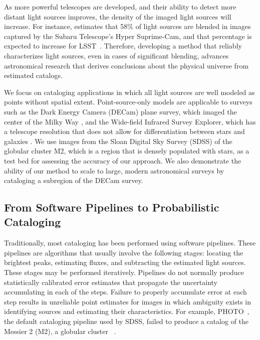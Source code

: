 As more powerful telescopes are developed, and their ability to detect more distant light sources improves,
the density of the imaged light sources will increase.
For instance, \cite{bosch2018hyper} estimates that 58\% of light sources are blended in images captured by the
Subaru Telescope’s Hyper Suprime-Cam, and that percentage is expected to increase for LSST~\citep{sanchez2021effects}.
Therefore, developing a method that reliably characterizes light sources, even in cases of significant blending,
advances astronomical research that derives conclusions about the physical universe from estimated catalogs.

We focus on cataloging applications in which all light sources are well modeled as points without spatial extent.
Point-source-only models are applicable to surveys such as the Dark Energy Camera (DECam) plane survey,
which imaged the center of the  Milky Way \citep{Schlafly_2018_DECam}, and
the Wide-field Infrared Survey Explorer,
which has a  telescope resolution that does not allow for differentiation between stars and galaxies \citep{Wright_2010_WISESurvey}.
We use images from the Sloan Digital Sky Survey (SDSS) of the globular cluster M2, which is a region that is densely populated with stars,
as a test bed for assessing the accuracy of our approach.
We also demonstrate the ability of our method to scale to large, modern astronomical surveys
by cataloging a subregion of the DECam survey.

\bigbreak

\subsection{From Software Pipelines to Probabilistic Cataloging}

Traditionally, most cataloging has been performed using software pipelines.
These pipelines are algorithms that usually involve the following stages: locating the brightest peaks, estimating fluxes, and subtracting the estimated light sources.
These stages may be performed iteratively.
Pipelines do not normally produce statistically calibrated error estimates that propagate
the uncertainty accumulating in each of the steps.
Failure to properly accumulate error at each step results in unreliable point estimates
for images in which ambiguity exists in identifying sources and estimating their characteristics.
For example, PHOTO~\citep{lupton2001sdss}, the default cataloging pipeline used by SDSS, failed to produce a catalog of the Messier 2 (M2), a globular cluster ~\citep{Portillo_2017}.

